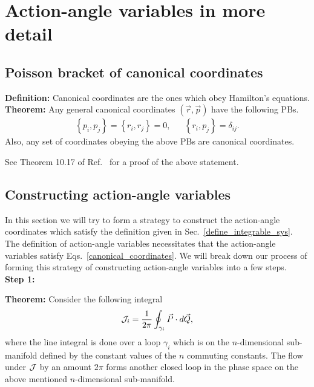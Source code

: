 \chapter{Action-angle variables in more detail}




\section{Poisson bracket of canonical coordinates}

\textbf{Definition:} Canonical coordinates are the ones which obey Hamilton's equations. \\
\textbf{Theorem:}  Any general canonical coordinates $(\vec{r}, \vec{p})$
 have the following PBs.
\begin{align}
\left\{p_{i}, p_{j}\right\}=\left\{r_{i}, r_{j}\right\}=0, 
&&\left\{r_{i}, p_{j}\right\}=\delta_{ij}.      \label{canonical_coordinates}
\end{align}
Also, any set of coordinates obeying the above PBs are canonical coordinates.




\hfill \break


\begin{definition}[label=def:C]
See Theorem 10.17 of Ref.~\cite{fasano} for a proof of the above statement.
\end{definition}

\hfill \break





\section{Constructing action-angle variables}   \label{construct_AA}


In this section we will try to form a strategy to construct
 the action-angle coordinates
which satisfy the definition given in Sec.~\ref{define_integrable_sys}.
The definition of action-angle variables necessitates that the 
action-angle variables satisfy Eqs.~\ref{canonical_coordinates}.
We will break down our process of forming this strategy 
of constructing action-angle variables into a few steps. \\



\textbf{Step 1:} 


\textbf{Theorem:} Consider the following integral
\begin{align}
\mathcal{J}_i  =   \frac{1}{2 \pi} \oint_{\gamma_i}   \vec{P} \cdot  d\vec{Q},       \label{action_integral}
\end{align}
where the line integral is done over 
a loop $\gamma_i$ which is on the 
$n$-dimensional sub-manifold
defined by the constant values of the $n$ commuting constants.
The flow under $\mathcal{J}$ by an amount $2 \pi$ forms another closed loop
in the phase space on the  above mentioned $n$-dimensional sub-manifold.




